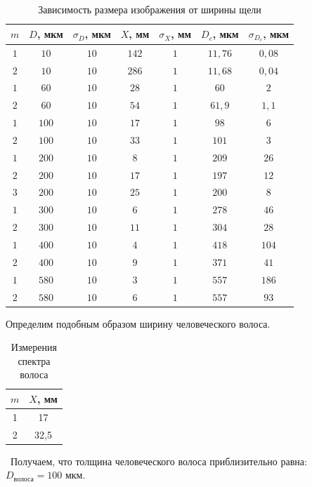 \documentclass[a5paper,10pt, twoside]{article} %
\begin{document}
	\begin{table}[h]
		\begin{center}
			\begin{tabular}{| c | c | c | c | c | c | c |}
				\hline
				$m$ & $D$, мкм & $\sigma_D$, мкм & $X$, мм & $\sigma_X$, мм & $D_c$, мкм & $\sigma_{D_c}$, мкм\\
				\hline
				$1$ & $10$ & $10$ & $142$ & $1$ & $11,76$ & $0,08$\\
				\hline
				$2$ & $10$ & $10$ & $286$ & $1$ & $11,68$ & $0,04$\\
				\hline
				$1$ & $60$ & $10$ & $28$ & $1$ & $60$ & $2$\\
				\hline
				$2$ & $60$ & $10$ & $54$ & $1$ & $61,9$ & $1,1$\\
				\hline
				$1$ & $100$ & $10$ & $17$ & $1$ & $98$ & $6$\\
				\hline
				$2$ & $100$ & $10$ & $33$ & $1$ & $101$ & $3$\\
				\hline
				$1$ & $200$ & $10$ & $8$ & $1$ & $209$ & $26$\\
				\hline
				$2$ & $200$ & $10$ & $17$ & $1$ & $197$ & $12$\\
				\hline
				$3$ & $200$ & $10$ & $25$ & $1$ & $200$ & $8$\\
				\hline
				$1$ & $300$ & $10$ & $6$ & $1$ & $278$ & $46$\\
				\hline
				$2$ & $300$ & $10$ & $11$ & $1$ & $304$ & $28$\\
				\hline
				$1$ & $400$ & $10$ & $4$ & $1$ & $418$ & $104$\\
				\hline
				$2$ & $400$ & $10$ & $9$ & $1$ & $371$ & $41$\\
				\hline
				$1$ & $580$ & $10$ & $3$ & $1$ & $557$ & $186$\\
				\hline
				$2$ & $580$ & $10$ & $6$ & $1$ & $557$ & $93$\\
				\hline
				\end{tabular}
		\end{center}
		\caption{Зависимость размера изображения от ширины щели}
	\end{table}

	Определим подобным образом ширину человеческого волоса. 

	\begin{table}[h!]
		\begin{center}
		\begin{tabular}{| c | c |}
			\hline
			$m$ & $X$, мм\\
			\hline
			1 & 17\\
			\hline
			2 & 32,5\\
			\hline
		\end{tabular}
		\end{center}

		\caption{Измерения спектра волоса}
	\end{table}
	\
	Получаем, что толщина человеческого волоса приблизительно равна: $D_\text{волоса} = 100$ мкм.
\end{document}
